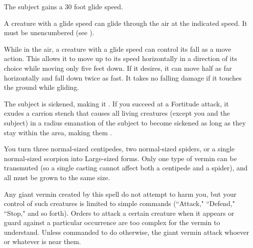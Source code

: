 \spellrng{\rngmed}
\spelldur{\durlong}
\begin{spelleffect}
  The subject gains a 30 foot glide speed.
\end{spelleffect}
\begin{spellnotes}
    A creature with a glide speed can glide through the air at the indicated speed. It must be unencumbered (see ).

    While in the air, a creature with a glide speed can control its fall as a move action. This allows it to move up to its speed horizontally in a direction of its choice while moving only five feet down. If it desires, it can move half as far horizontally and fall down twice as fast. It takes no falling damage if it touches the ground while gliding.
\end{spellnotes}

\spellrng{\rngtouch}
\spelldur{\durshort}
\begin{spelleffect}
  The subject is sickened, making it \vulnerable. If you succeed at a Fortitude attack, it exudes a carrion stench that causes all living creatures (except you and the subject) in a \areasmall radius emanation of the subject to become sickened as long as they stay within the area, making them \vulnerable.
\end{spelleffect}

\spellrng{\rngclose}
\spelldur{\durmed}
\begin{spelleffect}
  You turn three normal-sized centipedes, two normal-sized spiders, or a single normal-sized scorpion into Large-sized forms. Only one type of vermin can be transmuted (so a single casting cannot affect both a centipede and a spider), and all must be grown to the same size.
  \par Any giant vermin created by this spell do not attempt to harm you, but your control of such creatures is limited to simple commands (``Attack," ``Defend," ``Stop," and so forth). Orders to attack a certain creature when it appears or guard against a particular occurrence are too complex for the vermin to understand. Unless commanded to do otherwise, the giant vermin attack whoever or whatever is near them.
\end{spelleffect}

